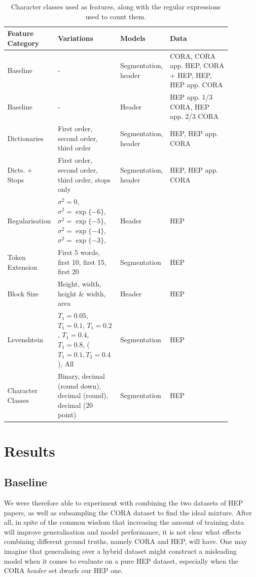 \begin{table}[h]
\begin{center}
\begin{tabular}{ | p{0.2\linewidth} | p{0.25\linewidth} | p{0.15\linewidth} | p{0.3\linewidth} |}
\hline
Feature Category & Variations & Models & Data\\
\hline
Baseline & - & Segmentation, header & CORA, CORA app. HEP, CORA + HEP, HEP, HEP app. CORA \\
\hline
Baseline & - & Header & HEP app. 1/3 CORA, HEP app. 2/3 CORA \\
\hline
Dictionaries & First order, second order, third order & Segmentation, header & HEP, HEP app. CORA \\
\hline
Dicts. + Stops & First order, second order, third order, stops only & Segmentation, header & HEP, HEP app. CORA \\
\hline
Regularisation & $\sigma^2=0$, $\sigma^2=\exp\{-6\}$,$\sigma^2=\exp\{-5\}$,$\sigma^2=\exp\{-4\}$,$\sigma^2=\exp\{-3\}$, & Header & HEP \\
\hline
Token Extension & First 5 words, first 10, first 15, first 20 & Segmentation & HEP \\
\hline
Block Size & Height, width, height \& width, area & Header & HEP \\
\hline
Levenshtein & $T_1 = 0.05$, $T_1 = 0.1$, $T_1 = 0.2$, $T_1 = 0.4$, $T_1 = 0.8$, ($T_1 = 0.1, T_2 = 0.4$), All & Segmentation & HEP \\
\hline
Character Classes & Binary, decimal (round down), decimal (round), decimal (20 point) & Segmentation & HEP \\
\hline
\end{tabular}
\caption[Character classes used as features, along with the regular expressions used to count them.]{Character classes used as features, along with the regular expressions used to count them.}
\label{table:experiments}
\end{center}
\end{table}

\section{Results}
\label{sec:results}
\subsection{Baseline}

We were therefore able to experiment with combining the two datasets of HEP papers, as well as subsampling the CORA dataset to find the ideal mixture. After all, in spite of the common wisdom that increasing the amount of training data will improve generalisation and model performance, it is not clear what effects combining different ground truths, namely CORA and HEP, will have. One may imagine that generalising over a hybrid dataset might construct a misleading model when it comes to evaluate on a pure HEP dataset, especially when the CORA \emph{header} set dwarfs our HEP one.

